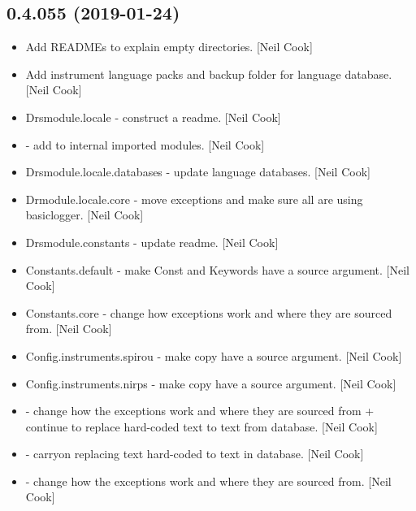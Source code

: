 \documentclass[a4paper,10pt,english]{report}
\begin{document}
\subsection{0.4.055 (2019-01-24)}
\label{\detokenize{misc/changelog:id208}}\begin{itemize}
\item {} 
Add READMEs to explain empty directories. {[}Neil Cook{]}

\item {} 
Add instrument language packs and backup folder for language database.
{[}Neil Cook{]}

\item {} 
Drsmodule.locale - construct a readme. {[}Neil Cook{]}

\item {} 
 - add  to internal imported
modules. {[}Neil Cook{]}

\item {} 
Drsmodule.locale.databases - update language databases. {[}Neil Cook{]}

\item {} 
Drmodule.locale.core - move exceptions and make sure all are using
basiclogger. {[}Neil Cook{]}

\item {} 
Drsmodule.constants - update readme. {[}Neil Cook{]}

\item {} 
Constants.default - make Const and Keywords have a source argument.
{[}Neil Cook{]}

\item {} 
Constants.core - change how exceptions work and where they are sourced
from. {[}Neil Cook{]}

\item {} 
Config.instruments.spirou - make copy have a source argument. {[}Neil
Cook{]}

\item {} 
Config.instruments.nirps - make copy have a source argument. {[}Neil
Cook{]}

\item {} 
 - change how the exceptions work and where they are
sourced from + continue to replace hard-coded text to text from
database. {[}Neil Cook{]}

\item {} 
 - carryon replacing text hard-coded to text in database.
{[}Neil Cook{]}

\item {} 
 - change how the exceptions work and where they are sourced
from. {[}Neil Cook{]}

\end{itemize}
\end{document}
